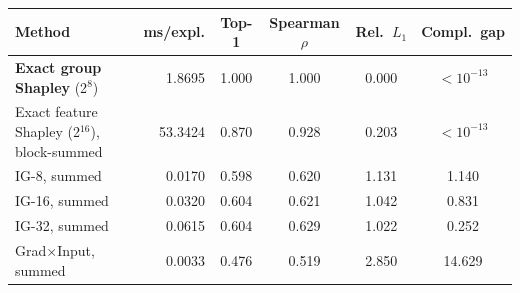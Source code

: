 \begin{tabular}{lrcccc}
\toprule
Method & ms/expl. & Top-1 & Spearman $\rho$ & Rel.\ $L_1$ & Compl.\ gap \\
\midrule
\textbf{Exact group Shapley} (2$^{8}$) & 1.8695 & 1.000 & 1.000 & 0.000 & $<10^{-13}$ \\
Exact feature Shapley (2$^{16}$), block-summed & 53.3424 & 0.870 & 0.928 & 0.203 & $<10^{-13}$ \\
IG-8, summed & 0.0170 & 0.598 & 0.620 & 1.131 & 1.140 \\
IG-16, summed & 0.0320 & 0.604 & 0.621 & 1.042 & 0.831 \\
IG-32, summed & 0.0615 & 0.604 & 0.629 & 1.022 & 0.252 \\
Grad$\times$Input, summed & 0.0033 & 0.476 & 0.519 & 2.850 & 14.629 \\
\bottomrule
\end{tabular}
